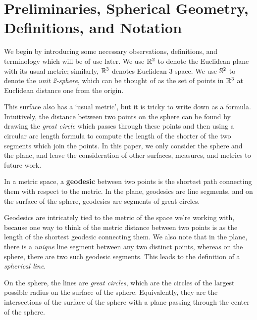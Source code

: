 \section{Preliminaries, Spherical Geometry, Definitions, and Notation}\label{sec:prelims}

We begin by introducing some necessary observations, definitions, and terminology
which will be of use later.  
 We use $\mathbb{R}^2$ to denote the 
Euclidean plane with its usual metric;
similarly, $\mathbb{R}^3$ denotes Euclidean 3-space.  We use $\mathbb{S}^2$ to denote the \textit{unit 2-sphere}, which can be 
thought of as the set of points in $\mathbb{R}^3$ at Euclidean distance one from the origin.  

This surface also has a `usual metric', but it is tricky to write down as a formula.   Intuitively, the distance between two points on the sphere can be found by drawing the \textit{great circle} which passes through these points and then using a circular arc length formula to compute the length of the shorter of the two segments which join the points.  
In this paper, we only consider the sphere and the plane, and leave the consideration of other surfaces, measures, and metrics to future work.










\begin{definition}
	In a metric space, a \textbf{geodesic} between two points is the shortest path connecting them with respect to the metric.
	In the plane, geodesics are line segments, and on the surface of the sphere, geodesics are segments of great circles.
\end{definition}





Geodesics are intricately tied to the metric of the space we're working with, because one way to think of the metric distance between two points is as the length of the shortest geodesic connecting them.  We also note that in the plane, there is a \textit{unique} line segment between any two distinct points, whereas on the sphere, there are two such geodesic segments.  This leads to the definition of a \textit{spherical line}.


\begin{definition}
	On the sphere, the lines are \textit{great circles}, which are the circles of the largest possible radius on the surface of the sphere.  Equivalently, they are the intersections of the surface of the sphere with a plane passing through the center of the sphere.
\end{definition}  

